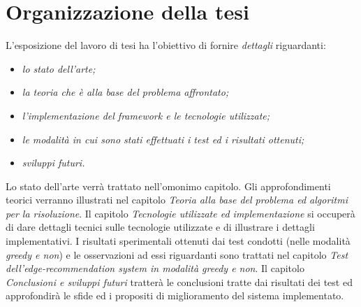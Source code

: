\section{Organizzazione della tesi}
\label{sec:organizzazione}
L'esposizione del lavoro di tesi ha l'obiettivo di fornire \textit{dettagli} riguardanti:
\begin{itemize}
\item \textit{lo stato dell'arte;}
\item \textit{la teoria che è alla base del problema affrontato;}
\item \textit{l'implementazione del framework e le tecnologie utilizzate;}
\item \textit{le modalità in cui sono stati effettuati i test ed i risultati ottenuti;}
\item \textit{sviluppi futuri.}
\end{itemize}
Lo stato dell'arte verrà trattato nell'omonimo capitolo. Gli approfondimenti teorici verranno illustrati nel capitolo \textit{Teoria alla base del problema ed algoritmi per la risoluzione}. Il capitolo \textit{Tecnologie utilizzate ed implementazione} si occuperà di dare dettagli tecnici sulle tecnologie utilizzate e di illustrare i dettagli implementativi. I risultati sperimentali ottenuti dai test condotti (nelle modalità \textit{greedy e non}) e le osservazioni ad essi riguardanti sono trattati nel capitolo \textit{Test dell'edge-recommendation system in modalità greedy e non}. Il capitolo \textit{Conclusioni e sviluppi futuri} tratterà le conclusioni tratte dai risultati dei test ed approfondirà le sfide ed i propositi di miglioramento del sistema implementato.


%




